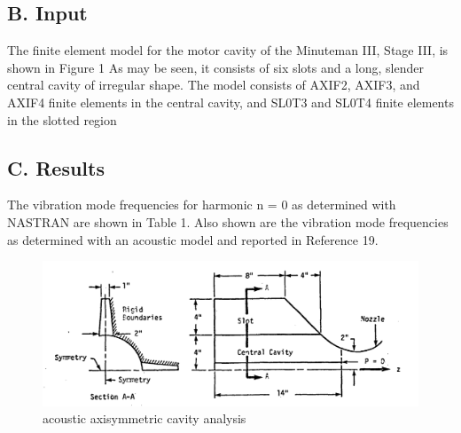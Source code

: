 \documentclass{article}
\begin{document}
\subsection{B. Input}

The finite element model for the motor cavity of the Minuteman III, Stage III, is shown in
Figure 1
As may be seen, it consists of six slots and a long, slender central cavity of
irregular shape. The model consists of AXIF2, AXIF3, and AXIF4 finite elements in the central
cavity, and SL0T3 and SL0T4 finite elements in the slotted region

\subsection{C. Results}

The vibration mode frequencies for harmonic n = 0 as determined with NASTRAN are shown in
Table 1. Also shown are the vibration mode frequencies as determined with an acoustic model
and reported in Reference 19.


\begin{figure}[v]
    \centering
\includegraphics[scale=0.25]{nastran_fig2}
    \caption{acoustic axisymmetric cavity analysis}
\end{figure}
\end{document}
